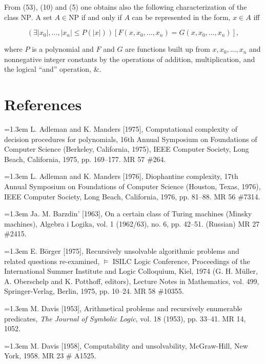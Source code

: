 \documentclass[11pt,leqno]{article}
\newcommand{\origpage}[1]{\marginnote{\footnotesize\textbf{[#1]}}}
\newcommand{\bibentry}[1]{\par\noindent\hangindent=1.3em\hangafter=1 #1\par\smallskip}
\begin{document}
From (53), (10) and (5) one obtains also the following characterization of the class $\mathrm{NP}$. A set $A\in\mathrm{NP}$ if and only if $A$ can be represented in the form, $x \in A$ iff

\begin{equation*}
\left(\exists |x_0|,\ldots,|x_n|\leq P(|x|)\right)\!\left[F(x,x_0,\ldots,x_n)=G(x,x_0,\ldots,x_n)\right], \tag{54}\label{eq:54}
\end{equation*}

where $P$ is a polynomial and $F$ and $G$ are functions built up from $x,x_0,\ldots,x_n$ and nonnegative integer constants by the operations of addition, multiplication, and the logical ``and'' operation, \&.

\section*{References\origpage{828}}
\begingroup\small\setlength{\parskip}{0pt}\setlength{\smallskipamount}{1pt}
\bibentry{L. Adleman and K. Manders [1975], Computational complexity of decision procedures for polynomials, 16th Annual Symposium on Foundations of Computer Science (Berkeley, California, 1975), IEEE Computer Society, Long Beach, California, 1975, pp. 169--177. MR 57 \#264.}

\bibentry{L. Adleman and K. Manders [1976], Diophantine complexity, 17th Annual Symposium on Foundations of Computer Science (Houston, Texas, 1976), IEEE Computer Society, Long Beach, California, 1976, pp. 81--88. MR 56 \#7314.}

\bibentry{Ja. M. Barzdin' [1963], On a certain class of Turing machines (Minsky machines), Algebra i Logika, vol. 1 (1962/63), no. 6, pp. 42--51. (Russian) MR 27 \#2415.}

\bibentry{E. B\"{o}rger [1975], Recursively unsolvable algorithmic problems and related questions re-examined, $\models$ ISILC Logic Conference, Proceedings of the International Summer Institute and Logic Colloquium, Kiel, 1974 (G. H. M\"{u}ller, A. Oberschelp and K. Potthoff, editors), Lecture Notes in Mathematics, vol. 499, Springer-Verlag, Berlin, 1975, pp. 10--24. MR 58 \#10355.}

\bibentry{M. Davis [1953], Arithmetical problems and recursively enumerable predicates, \textit{The Journal of Symbolic Logic}, vol. 18 (1953), pp. 33--41. MR 14, 1052.}

\bibentry{M. Davis [1958], Computability and unsolvability, McGraw-Hill, New York, 1958. MR 23 \# A1525.}
\end{document}
